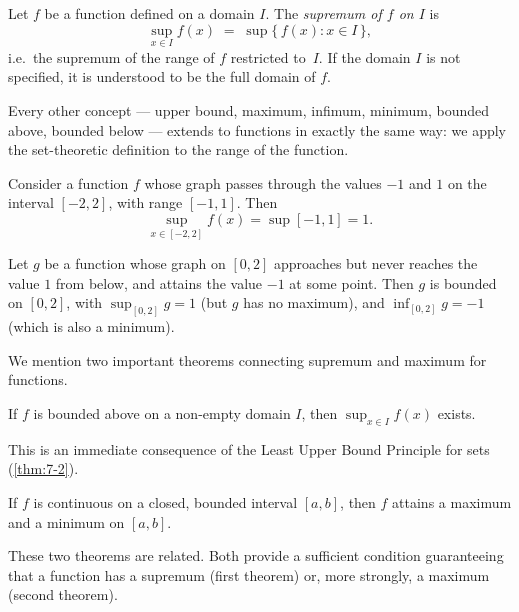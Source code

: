 \begin{definition}
\label{def:7-7}
Let $f$ be a function defined on a domain $I$.  The \emph{supremum of $f$ on $I$} is
\[
  \sup_{x \in I} f(x) \;=\; \sup\bigl\{\, f(x) : x \in I \,\bigr\},
\]
i.e.\ the supremum of the range of $f$ restricted to~$I$.  If the domain $I$ is not specified, it is understood to be the full domain of $f$.
\end{definition}

\begin{remark}
Every other concept --- upper bound, maximum, infimum, minimum, bounded above, bounded below --- extends to functions in exactly the same way: we apply the set-theoretic definition to the range of the function.
\end{remark}

\begin{example}
\label{ex:7-6}
Consider a function $f$ whose graph passes through the values $-1$ and $1$ on the interval $[-2,2]$, with range $[-1,1]$.  Then
\[
  \sup_{x \in [-2,2]} f(x) = \sup[-1,1] = 1.
\]
\end{example}

\begin{example}
\label{ex:7-7}
Let $g$ be a function whose graph on $[0,2]$ approaches but never reaches the value $1$ from below, and attains the value $-1$ at some point.  Then $g$ is bounded on $[0,2]$, with $\sup_{[0,2]} g = 1$ (but $g$ has no maximum), and $\inf_{[0,2]} g = -1$ (which is also a minimum).
\end{example}

We mention two important theorems connecting supremum and maximum for functions.

\begin{theorem}
\label{thm:7-3}
If $f$ is bounded above on a non-empty domain $I$, then $\sup_{x \in I} f(x)$ exists.
\end{theorem}

This is an immediate consequence of the Least Upper Bound Principle for sets (\cref{thm:7-2}).

\begin{theorem}
\label{thm:7-4}
If $f$ is continuous on a closed, bounded interval $[a,b]$, then $f$ attains a maximum and a minimum on $[a,b]$.
\end{theorem}

\begin{remark}
These two theorems are related.  Both provide a sufficient condition guaranteeing that a function has a supremum (first theorem) or, more strongly, a maximum (second theorem).
\end{remark}

